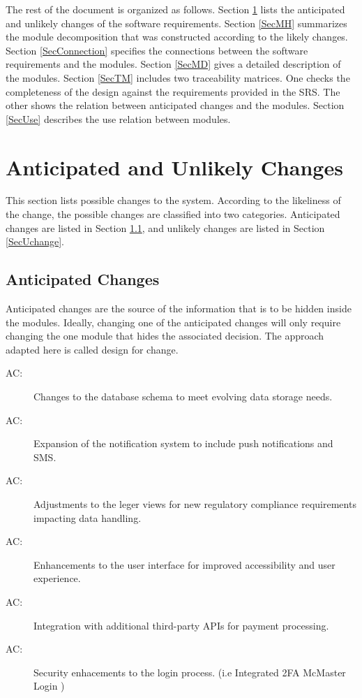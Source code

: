 \documentclass[12pt, titlepage]{article}
\newcounter{acnum}
\newcommand{\actheacnum}{AC\theacnum}
\begin{document}
The rest of the document is organized as follows. Section
\ref{SecChange} lists the anticipated and unlikely changes of the software
requirements. Section \ref{SecMH} summarizes the module decomposition that
was constructed according to the likely changes. Section \ref{SecConnection}
specifies the connections between the software requirements and the
modules. Section \ref{SecMD} gives a detailed description of the
modules. Section \ref{SecTM} includes two traceability matrices. One checks
the completeness of the design against the requirements provided in the SRS. The
other shows the relation between anticipated changes and the modules. Section
\ref{SecUse} describes the use relation between modules.

\section{Anticipated and Unlikely Changes} \label{SecChange}

This section lists possible changes to the system. According to the likeliness
of the change, the possible changes are classified into two
categories. Anticipated changes are listed in Section \ref{SecAchange}, and
unlikely changes are listed in Section \ref{SecUchange}.

\subsection{Anticipated Changes} \label{SecAchange}

Anticipated changes are the source of the information that is to be hidden
inside the modules. Ideally, changing one of the anticipated changes will only
require changing the one module that hides the associated decision. The approach
adapted here is called design for
change.

\begin{description}
\item[ \actheacnum \label{acDataSchema}:] Changes to the database schema to meet evolving data storage needs.
\item[ \actheacnum \label{acNotifications}:] Expansion of the notification system to include push notifications and SMS.
\item[ \actheacnum \label{acCompliance}:] Adjustments to the leger views for new regulatory compliance requirements impacting data handling.
\item[ \actheacnum \label{acUI}:] Enhancements to the user interface for improved accessibility and user experience.
\item[ \actheacnum \label{acIntegration}:] Integration with additional third-party APIs for payment processing.
\item[ \actheacnum \label{acLogin}:] Security enhacements to the login process. (i.e Integrated 2FA McMaster Login )
\end{description}
\end{document}
